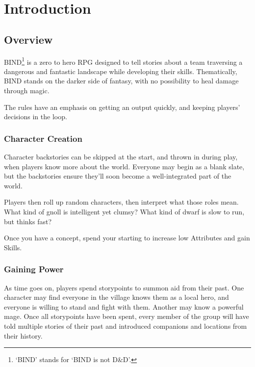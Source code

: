 \chapter*{Introduction}

\section*{Overview}

\begin{multicols}{2}

\noindent
BIND\footnote{`BIND' stands for `BIND is not D\&D'.} is a zero to hero RPG designed to tell stories about a team traversing a dangerous and fantastic landscape while developing their skills.
Thematically, BIND stands on the darker side of fantasy, with no possibility to heal damage through magic.

The rules have an emphasis on getting an output quickly, and keeping players' decisions in the loop.

\subsection*{Character Creation}

Character backstories can be skipped at the start, and thrown in during play, when players know more about the world.
Everyone may begin as a blank slate, but the backstories ensure they'll soon become a well-integrated part of the world.

Players then roll up random characters, then interpret what those roles mean.
What kind of gnoll is intelligent yet clumsy?
What kind of dwarf is slow to run, but thinks fast?

Once you have a concept, spend your starting  to increase low Attributes and gain Skills.

\subsection*{Gaining Power}

As time goes on, players spend \glspl{storypoint} to summon aid from their past.
One character may find everyone in the village knows them as a local hero, and everyone is willing to stand and fight with them.
Another may know a powerful mage.
Once all \glspl{storypoint} have been spent, every member of the group will have told multiple stories of their past and introduced companions and locations from their history.


\end{multicols}
